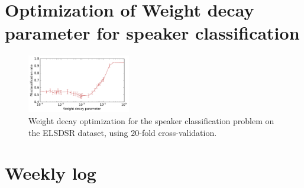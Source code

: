 \twocolumn

\section{Optimization of Weight decay parameter for speaker classification}
\label{appendix:optimization-weight-decay}
\begin{figure}[H]
	\centering
	\includegraphics[width=0.4\textwidth]{plots/reg_opt_dieleman_speaker_elsdsr_fine_grid}
	\caption{Weight decay optimization for the speaker classification problem on the ELSDSR dataset, using $20$-fold cross-validation.}
\end{figure}

\section{Weekly log}










